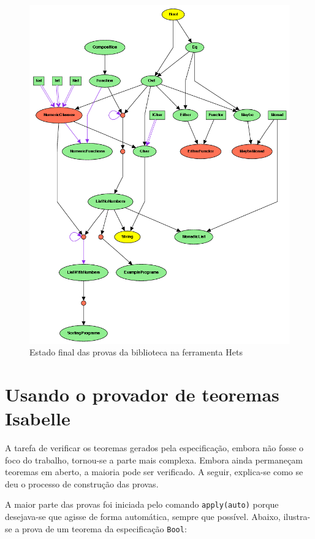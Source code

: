 \begin{figure}[hp]
    \centering
        \includegraphics[scale=0.9]{figuras/ProofEnd.png}
    \caption{Estado final das provas da biblioteca na ferramenta Hets}
    \label{fig:ProofEnd}
\end{figure}

\section{Usando o provador de teoremas Isabelle}
A tarefa de verificar os teoremas gerados pela especificação, embora não fosse o foco do trabalho, tornou-se a parte mais complexa. Embora ainda permaneçam teoremas em aberto, a maioria pode ser verificado. A seguir, explica-se como se deu o processo de construção das provas.

A maior parte das provas foi iniciada pelo comando \Verb.apply(auto). porque desejava-se que \Isabelle agisse de forma automática, sempre que possível. Abaixo, ilustra-se a prova de um teorema da especificação \Verb.Bool.:

